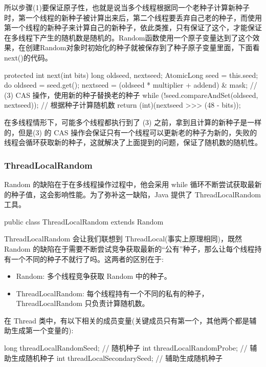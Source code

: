 所以步骤(1)要保证原子性，也就是说当多个线程根据同一个老种子计算新种子时，第一个线程的新种子被计算出来后，第二个线程要丢弃自己老的种子，而使用第一个线程的新种子来计算自己的新种子，依此类推，只有保证了这个，才能保证在多线程下产生的随机数是随机的。Random函数使用一个原子变量达到了这个效果，在创建Random对象时初始化的种子就被保存到了种子原子变量里面，下面看next()的代码。

\begin{Java}
protected int next(int bits) {
    long oldseed, nextseed;
    AtomicLong seed = this.seed;
    do {
        oldseed = seed.get();
        nextseed = (oldseed * multiplier + addend) & mask;
    // (3) CAS 操作，使用新的种子替换老的种子
    } while (!seed.compareAndSet(oldseed, nextseed));
    // 根据种子计算随机数
    return (int)(nextseed >>> (48 - bits));
}
\end{Java}

在多线程情形下，可能多个线程都执行到了 (3) 之前，拿到且计算的新种子是一样的，但是(3) 的 CAS 操作会保证只有一个线程可以更新老的种子为新的，失败的线程会循环获取新的种子，这就解决了上面提到的问题，保证了随机数的随机性。

\subsubsection{ThreadLocalRandom}

Random 的缺陷在于在多线程操作过程中，他会采用 while 循环不断尝试获取最新的种子值，这会影响性能。为了弥补这一缺陷，Java 提供了 ThreadLocalRandom 工具。

\begin{Java}
public class ThreadLocalRandom extends Random
\end{Java}

ThreadLocalRandom 会让我们联想到 ThreadLocal(事实上原理相同)，既然 Random 的缺陷在于需要不断尝试竞争获取最新的``公有''种子，那么让每个线程持有一个不同的种子不就行了吗。这两者的区别在于:

\begin{itemize}
    \item Random: 多个线程竞争获取 Random 中的种子。
    \item ThreadLocalRandom: 每个线程持有一个不同的私有的种子，ThreadLocalRandom 只负责计算随机数。
\end{itemize}

在 Thread 类中，有以下相关的成员变量(关键成员只有第一个，其他两个都是辅助生成第一个变量的):
\begin{Java}
long threadLocalRandomSeed;     // 随机种子
int threadLocalRandomProbe;     // 辅助生成随机种子
int threadLocalSecondarySeed;   // 辅助生成随机种子
\end{Java}

